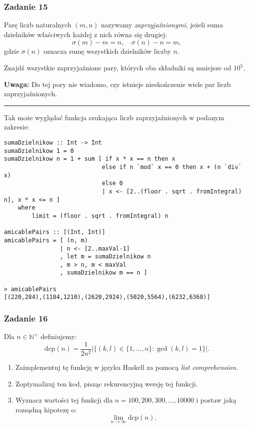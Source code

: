 \documentclass[11pt,a4paper]{article}
\begin{document}
\subsubsection{Zadanie 15}
Parę liczb naturalnych \((m, n)\) nazywamy \textit{zaprzyjaźnionymi}, jeżeli suma dzielników właściwych każdej z nich równa się drugiej:
\[
    \sigma(m) - m = n, \quad \sigma(n) - n = m,
\]
gdzie \(\sigma(n)\) oznacza sumę wszystkich dzielników liczby \(n\).

Znajdź wszystkie zaprzyjaźnione pary, których oba składniki są mniejsze od \(10^5\).

\textbf{Uwaga:} Do tej pory nie wiadomo, czy istnieje nieskończenie wiele par liczb zaprzyjaźnionych.

\bigskip
\hrule
\bigskip

Tak może wyglądać funkcja szukająca liczb zaprzyjaźnionych w podanym zakresie:
\begin{Verbatim}[frame=single]
sumaDzielnikow :: Int -> Int
sumaDzielnikow 1 = 0
sumaDzielnikow n = 1 + sum [ if x * x == n then x
                            else if n `mod` x == 0 then x + (n `div` x)
                            else 0
                            | x <- [2..(floor . sqrt . fromIntegral) n], x * x <= n ]
    where
        limit = (floor . sqrt . fromIntegral) n

amicablePairs :: [(Int, Int)]
amicablePairs = [ (n, m)
                | n <- [2..maxVal-1]
                , let m = sumaDzielnikow n
                , m > n, m < maxVal
                , sumaDzielnikow m == n ]

> amicablePairs
[(220,284),(1184,1210),(2620,2924),(5020,5564),(6232,6368)]
\end{Verbatim}

\subsubsection{Zadanie 16}
Dla \(n \in \mathbb{N}^+\) definiujemy:
\begin{equation}
    \text{dcp}(n) = \frac{1}{2 n^2} \left| \{(k, l) \in \{1, \dots, n\} : \gcd(k, l) = 1\} \right|.
\end{equation}

\begin{enumerate}
    \item Zaimplementuj tę funkcję w języku Haskell za pomocą \textit{list comprehension}.
    \item Zoptymalizuj ten kod, pisząc rekurencyjną wersję tej funkcji.
    \item Wyznacz wartości tej funkcji dla \(n = 100, 200, 300, \dots, 10000\) i postaw jaką rozsądną hipotezę o:
        \begin{equation}
            \lim\limits_{n \to \infty} \text{dcp}(n).
        \end{equation}
\end{enumerate}
\end{document}
